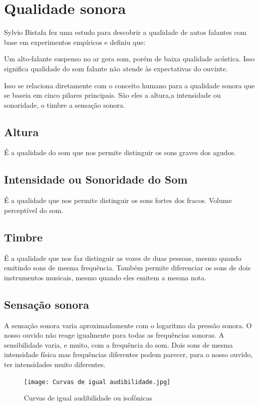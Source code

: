 \documentclass[
	article,			%
	11pt,				%
	oneside,			%
	a4paper,			%
	english,			%
	brazil,				%
	sumario=tradicional
	]{abntex2}
\begin{document}
\section{Qualidade sonora}
Sylvio Bistafa fez uma estudo para descobrir a qualidade de autos falantes com base em experimentos empíricos e definiu que:
\begin{citacao}
Um alto-falante suspenso no ar gera som, porém de baixa qualidade acústica. Isso significa qualidade do som falante não atende às expectativas do ouvinte.\cite{bistafa2018acustica}
\end{citacao}
Isso se relaciona diretamente com o conceito humano para a qualidade sonora que se baseia em cinco pilares principais. São eles a altura,a intensidade ou sonoridade, o timbre a sensação sonora.

\subsection{Altura}
É a qualidade do som que nos permite distinguir os sons graves dos agudos.
\subsection{Intensidade ou Sonoridade do Som}
É a qualidade que nos permite distinguir os sons fortes dos fracos. Volume perceptível do som.
\subsection{Timbre}
É a qualidade que nos faz distinguir as vozes de duas pessoas, mesmo quando emitindo sons de mesma frequência.
Também permite diferenciar os sons de dois instrumentos musicais, mesmo quando eles emitem a mesma nota.

\subsection{Sensação sonora}
A sensação sonora varia aproximadamente com o logaritmo da pressão sonora.
O nosso ouvido não reage igualmente para todas as frequências sonoras.
A sensibilidade varia, e muito, com a frequência do som.
Dois sons de mesma intensidade física mas frequências diferentes podem parecer, para o nosso ouvido, ter intensidades muito diferentes.

\begin{figure}[h]
\caption{Curvas de igual audibilidade ou
isofônicas}
\centering %
\texttt{[image: Curvas de igual audibilidade.jpg]} %
\label{Curvas de igual audibilidade ou
isofônicas}
\end{figure}
\end{document}
